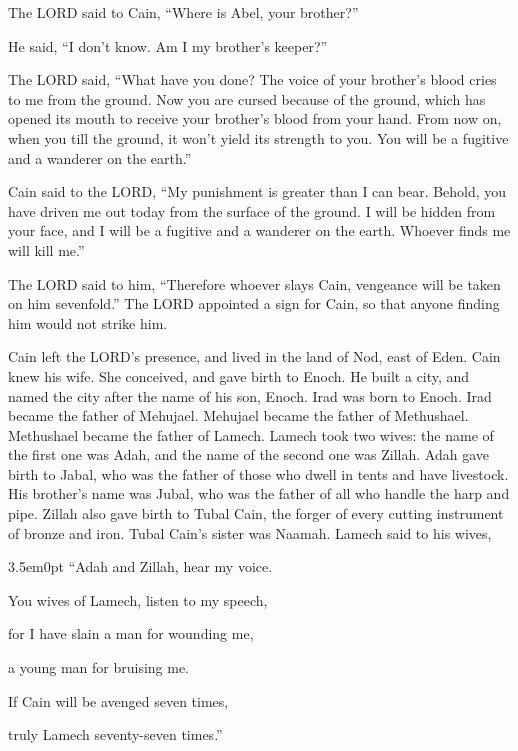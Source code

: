 \myverse{}The LORD said to Cain, “Where is Abel, your brother?”

He said, “I don’t know. Am I my brother’s keeper?”

\myverse{}The LORD said, “What have you done? The voice of your brother’s blood cries to me from the ground.  \myverse{}Now you are cursed because of the ground, which has opened its mouth to receive your brother’s blood from your hand.  \myverse{}From now on, when you till the ground, it won’t yield its strength to you. You will be a fugitive and a wanderer on the earth.”

\myverse{}Cain said to the LORD, “My punishment is greater than I can bear.  \myverse{}Behold, you have driven me out today from the surface of the ground. I will be hidden from your face, and I will be a fugitive and a wanderer on the earth. Whoever finds me will kill me.”

\myverse{}The LORD said to him, “Therefore whoever slays Cain, vengeance will be taken on him sevenfold.” The LORD appointed a sign for Cain, so that anyone finding him would not strike him.

\myverse{}Cain left the LORD’s presence, and lived in the land of Nod, east of Eden.  \myverse{}Cain knew his wife. She conceived, and gave birth to Enoch. He built a city, and named the city after the name of his son, Enoch.  \myverse{}Irad was born to Enoch. Irad became the father of Mehujael. Mehujael became the father of Methushael. Methushael became the father of Lamech.  \myverse{}Lamech took two wives: the name of the first one was Adah, and the name of the second one was Zillah.  \myverse{}Adah gave birth to Jabal, who was the father of those who dwell in tents and have livestock.  \myverse{}His brother’s name was Jubal, who was the father of all who handle the harp and pipe.  \myverse{}Zillah also gave birth to Tubal Cain, the forger of every cutting instrument of bronze and iron. Tubal Cain’s sister was Naamah.  \myverse{} Lamech said to his wives,
\begin{adjustwidth}{3.5em}{0pt}
	“Adah and Zillah, hear my voice.
	
	You wives of Lamech, listen to my speech,
	
	for I have slain a man for wounding me,
	
	a young man for bruising me.
	
	\myverse{}If Cain will be avenged seven times,
	
	truly Lamech seventy-seven times.”
\end{adjustwidth}

